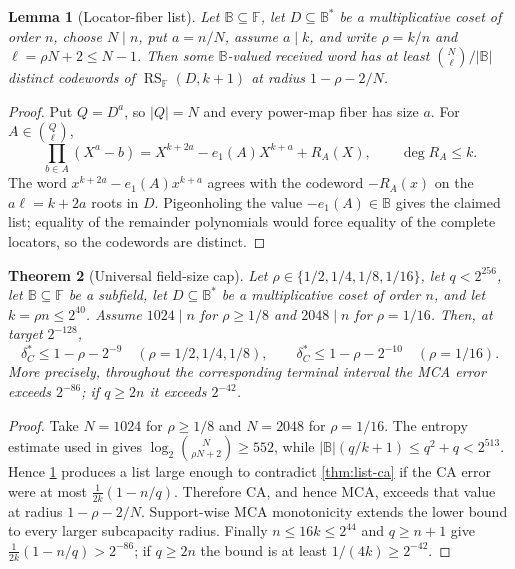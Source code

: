 \documentclass[11pt,a4paper]{amsart}
\numberwithin{equation}{section}
\newtheorem{theorem}{Theorem}[section]
\newtheorem{lemma}[theorem]{Lemma}
\theoremstyle{remark}
\DeclareMathOperator{\RS}{RS}
\newcommand{\F}{\mathbb F}
\newcommand{\B}{\mathbb B}
\begin{document}
\begin{lemma}[Locator-fiber list]\label{lem:quotient-list}
Let $\B\subseteq\F$, let $D\subseteq\B^*$ be a multiplicative coset of order $n$, choose $N\mid n$, put $a=n/N$, assume $a\mid k$, and write $\rho=k/n$ and $\ell=\rho N+2\le N-1$.  Then some $\B$-valued received word has at least $\binom N\ell/|\B|$ distinct codewords of $\RS_{\F}(D,k+1)$ at radius $1-\rho-2/N$.
\end{lemma}

\begin{proof}
Put $Q=D^a$, so $|Q|=N$ and every power-map fiber has size $a$.  For $A\in\binom Q\ell$,
\[
 \prod_{b\in A}(X^a-b)=X^{k+2a}-e_1(A)X^{k+a}+R_A(X),\qquad \deg R_A\le k.
\]
The word $x^{k+2a}-e_1(A)x^{k+a}$ agrees with the codeword $-R_A(x)$ on the $a\ell=k+2a$ roots in $D$.  Pigeonholing the value $-e_1(A)\in\B$ gives the claimed list; equality of the remainder polynomials would force equality of the complete locators, so the codewords are distinct.
\end{proof}

\begin{theorem}[Universal field-size cap]\label{thm:universal-cap}
Let $\rho\in\{1/2,1/4,1/8,1/16\}$, let $q<2^{256}$, let $\B\subseteq\F$ be a subfield, let $D\subseteq\B^*$ be a multiplicative coset of order $n$, and let $k=\rho n\le2^{40}$.  Assume $1024\mid n$ for $\rho\ge1/8$ and $2048\mid n$ for $\rho=1/16$.  Then, at target $2^{-128}$,
\[
 \delta_C^*\le1-\rho-2^{-9}\quad(\rho=1/2,1/4,1/8),\qquad
 \delta_C^*\le1-\rho-2^{-10}\quad(\rho=1/16).
\]
More precisely, throughout the corresponding terminal interval the MCA error exceeds $2^{-86}$; if $q\ge2n$ it exceeds $2^{-42}$.
\end{theorem}

\begin{proof}
Take $N=1024$ for $\rho\ge1/8$ and $N=2048$ for $\rho=1/16$.  The entropy estimate used in \cite[Corollary ``universal field-size cap for the challenge envelope'']{ChoCap26} gives
$\log_2\binom N{\rho N+2}\ge552$, while
$|\B|(q/k+1)\le q^2+q<2^{513}$.  Hence \cref{lem:quotient-list} produces a list large enough to contradict \cref{thm:list-ca} if the CA error were at most $\frac1{2k}(1-n/q)$.  Therefore CA, and hence MCA, exceeds that value at radius $1-\rho-2/N$.  Support-wise MCA monotonicity extends the lower bound to every larger subcapacity radius.  Finally $n\le16k\le2^{44}$ and $q\ge n+1$ give $\frac1{2k}(1-n/q)>2^{-86}$; if $q\ge2n$ the bound is at least $1/(4k)\ge2^{-42}$.
\end{proof}
\end{document}
